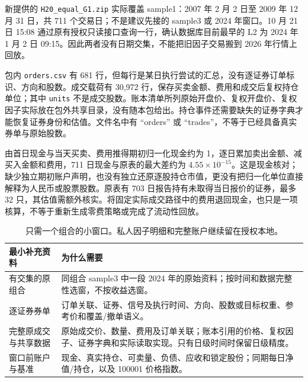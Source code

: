 \par{}

新提供的 \texttt{H20\_equal\_G1.zip} 实际覆盖 sample1：2007 年 2 月 2 日至 2009 年 12 月 31 日，共 711 个交易日；不是建议先接的 sample3 或 2024 年窗口。10 月 21 日 15:08 通过原有授权只读接口查询一行，确认数据库目前最早的 L2 为 2024 年 1 月 2 日 09:15。因此两者没有日期交集，不能把旧因子交易搬到 2026 年行情上回放。

包内 \texttt{orders.csv} 有 681 行，但每行是某日执行尝试的汇总，没有逐证券订单标识、方向和股数。成交载荷有 30,972 行，保存买卖金额、费用和成交后复权持仓单位；其中 \texttt{units} 不是成交股数。账本清单所列原始开盘价、复权开盘价、复权因子实际放在包外共享目录，没有随本包给出。持仓事件还需要缺失的证券字典才能恢复证券身份和估值。文件名中有 ``orders'' 或 ``trades''，不等于已经具备真实券单与原始股数。

由首日现金与当天买卖、费用推得期初归一化现金约为 1，逐日累加卖出金额、减买入金额和费用，711 日现金与原表的最大差约为 $4.55\times10^{-15}$。这是现金核对；缺少独立期初账户声明，也没有独立还原逐股持仓市值，更没有把归一化单位直接解释为人民币或股票股数。原表有 703 日报告持有未取得当日报价的证券，最多 32 只，其估值需额外核实。将固定实际成交路径中的费用退回现金，也只是一项核算，不等于重新生成零费策略或完成了流动性回放。

\begin{table}[H]\centering\small
\begin{tabularx}{\linewidth}{p{30mm}Y}
\toprule 最小补充资料 & 为什么需要\\\midrule
有交集的原组合 & 同组合 sample3 中一段 2024 年的原始资料；按时间和数据完整性选窗，不按收益选窗。\\
逐证券券单 & 订单关联、证券、信号及执行时间、方向、股数或目标权重、参考价和覆盖/撤单语义。\\
完整原成交与共享数据 & 原始成交价、数量、费用及订单关联；账本引用的价格、复权因子、证券字典和实际读取实现。只有日级时间时保留日级精度。\\
窗口前账户与基准 & 现金、真实持仓、可卖量、负债、应收和锁定股份；同期每日净值/持仓，以及 100001 价格指数。\\
\bottomrule
\end{tabularx}
\caption{只需一个组合的小窗口。私人因子明细和完整账户继续留在授权本地。}
\end{table}

